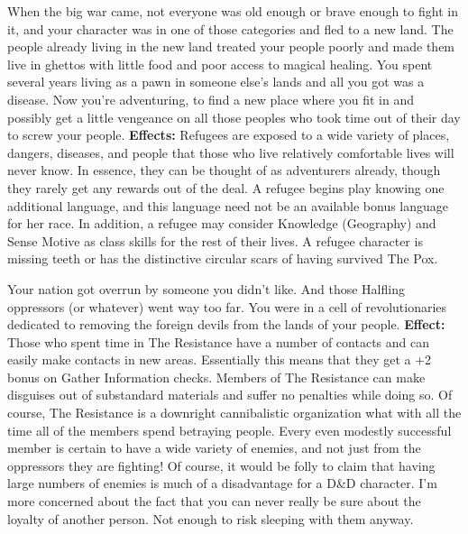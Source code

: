 \medskip{}
{When the big war came, not everyone was old enough or brave enough to fight in it, and your character was in one of those categories and fled to a new land. The people already living in the new land treated your people poorly and made them live in ghettos with little food and poor access to magical healing. You spent several years living as a pawn in someone else's lands and all you got was a disease. Now you're adventuring, to find a new place where you fit in and possibly get a little vengeance on all those peoples who took time out of their day to screw your people.}
\textbf{Effects:}{ Refugees are exposed to a wide variety of places, dangers, diseases, and people that those who live relatively comfortable lives will never know. In essence, they can be thought of as adventurers already, though they rarely get any rewards out of the deal. A refugee begins play knowing one additional language, and this language need not be an available bonus language for her race. In addition, a refugee may consider Knowledge (Geography) and Sense Motive as class skills for the rest of their lives. A refugee character is missing teeth or has the distinctive circular scars of having survived The Pox.}

\medskip{}
{Your nation got overrun by someone you didn't like. And those Halfling oppressors (or whatever) went way too far. You were in a cell of revolutionaries dedicated to removing the foreign devils from the lands of your people.}
\textbf{Effect:}{ Those who spent time in The Resistance have a number of contacts and can easily make contacts in new areas. Essentially this means that they get a +2 bonus on Gather Information checks. Members of The Resistance can make disguises out of substandard materials and suffer no penalties while doing so. Of course, The Resistance is a downright cannibalistic organization what with all the time all of the members spend betraying people. Every even modestly successful member is certain to have a wide variety of enemies, and not just from the oppressors they are fighting! Of course, it would be folly to claim that having large numbers of enemies is much of a disadvantage for a D\&D character. I'm more concerned about the fact that you can never really be sure about the loyalty of another person. Not enough to risk sleeping with them anyway.}


